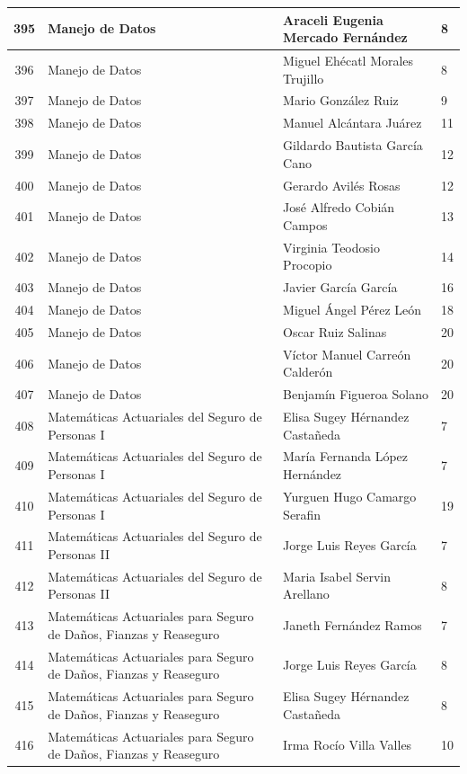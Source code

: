 {\begin{longtable}{|c|p{6.5cm}|p{5cm}|p{1.5cm}|}
  395 & Manejo de Datos & Araceli Eugenia Mercado Fernández & 8 \\ \hline
  396 & Manejo de Datos & Miguel Ehécatl Morales Trujillo & 8 \\ \hline
  397 & Manejo de Datos & Mario González Ruiz & 9 \\ \hline
  398 & Manejo de Datos & Manuel Alcántara Juárez & 11 \\ \hline
  399 & Manejo de Datos & Gildardo Bautista García Cano & 12 \\ \hline
  400 & Manejo de Datos & Gerardo Avilés Rosas & 12 \\ \hline
  401 & Manejo de Datos & José Alfredo Cobián Campos & 13 \\ \hline
  402 & Manejo de Datos & Virginia Teodosio Procopio & 14 \\ \hline
  403 & Manejo de Datos & Javier García García & 16 \\ \hline
  404 & Manejo de Datos & Miguel Ángel Pérez León & 18 \\ \hline
  405 & Manejo de Datos & Oscar Ruiz Salinas & 20 \\ \hline
  406 & Manejo de Datos & Víctor Manuel Carreón Calderón & 20 \\ \hline
  407 & Manejo de Datos & Benjamín Figueroa Solano & 20 \\ \hline
  408 & Matemáticas Actuariales del Seguro de Personas I & Elisa Sugey Hérnandez Castañeda & 7 \\ \hline
  409 & Matemáticas Actuariales del Seguro de Personas I & María Fernanda López Hernández & 7 \\ \hline
  410 & Matemáticas Actuariales del Seguro de Personas I & Yurguen Hugo Camargo Serafin & 19 \\ \hline
  411 & Matemáticas Actuariales del Seguro de Personas II & Jorge Luis Reyes García & 7 \\ \hline
  412 & Matemáticas Actuariales del Seguro de Personas II & Maria Isabel Servin Arellano & 8 \\ \hline
  413 & Matemáticas Actuariales para Seguro de Daños, Fianzas y Reaseguro & Janeth Fernández Ramos & 7 \\ \hline
  414 & Matemáticas Actuariales para Seguro de Daños, Fianzas y Reaseguro & Jorge Luis Reyes García & 8 \\ \hline
  415 & Matemáticas Actuariales para Seguro de Daños, Fianzas y Reaseguro & Elisa Sugey Hérnandez Castañeda & 8 \\ \hline
  416 & Matemáticas Actuariales para Seguro de Daños, Fianzas y Reaseguro & Irma Rocío Villa Valles & 10 \\ \hline

\end{longtable}}
